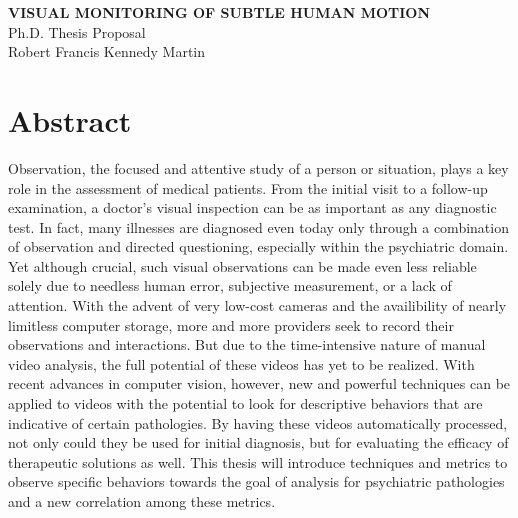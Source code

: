 \documentclass[11pt]{article}
\begin{document}

%
\newpage
\thispagestyle{empty}
\begin{center}
\textbf{VISUAL MONITORING OF SUBTLE HUMAN MOTION}\\
Ph.D. Thesis Proposal\\
\bigskip
Robert Francis Kennedy Martin\\
\end{center}
\clearpage
{}
\section{Abstract}
\noindent
Observation, the focused and attentive study of a person or situation, plays a key role in the assessment of medical patients. From the initial visit to a follow-up examination, a doctor's visual inspection can be as important as any diagnostic test. In fact, many illnesses are diagnosed even today only through a combination of observation and directed questioning, especially within the psychiatric domain. Yet although crucial, such visual observations can be made even less reliable solely due to needless human error, subjective measurement, or a lack of attention. With the advent of very low-cost cameras and the availibility of nearly limitless computer storage, more and more providers seek to record their observations and interactions. But due to the time-intensive nature of manual video analysis, the full potential of these videos has yet to be realized. With recent advances in computer vision, however, new and powerful techniques can be applied to videos with the potential to look for descriptive behaviors that are indicative of certain pathologies. By having these videos automatically processed, not only could they be used for initial diagnosis, but for evaluating the efficacy of therapeutic solutions as well. This thesis will introduce techniques and metrics to observe specific behaviors towards the goal of analysis for psychiatric pathologies and a new correlation among these metrics.
\end{document}
